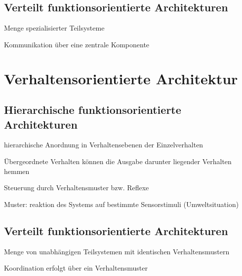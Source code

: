 \subsection{Verteilt funktionsorientierte Architekturen}
\begin{compactitem}
    \item Menge spezialisierter Teilsysteme
    \item Kommunikation über eine zentrale Komponente
\end{compactitem}
\section{Verhaltensorientierte Architektur}
\subsection{Hierarchische funktionsorientierte Architekturen}
\begin{compactitem}
    \item hierarchische Anordnung in Verhaltensebenen der Einzelverhalten
    \item Übergeordnete Verhalten können die Ausgabe darunter liegender Verhalten
    hemmen
    \item Steuerung durch Verhaltensmuster bzw. Reflexe
    \item Muster: reaktion des Systems auf bestimmte Sensorstimuli (Umweltsituation)
\end{compactitem}
\subsection{Verteilt funktionsorientierte Architekturen}
\begin{compactitem}
    \item Menge von unabhängigen Teilsystemen mit identischen Verhaltensmustern
    \item Koordination erfolgt über ein Verhaltensmuster
\end{compactitem}
